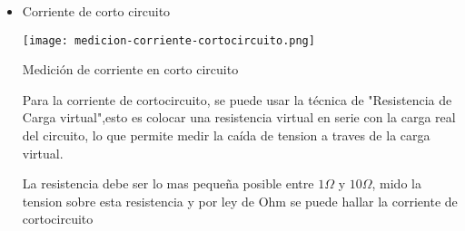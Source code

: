 \begin{itemize}
    \item Corriente de corto circuito
    \begin{ilustracion}[ht]
        \centering
        \texttt{[image: medicion-corriente-cortocircuito.png]}
        \caption{Medición de corriente en corto circuito}
        \label{ilus:medicion-corriente-cortocircuito}
    \end{ilustracion}
    Para la corriente de cortocircuito, se puede usar la técnica de "Resistencia de Carga virtual",esto es colocar una resistencia virtual en serie con la carga real del circuito, lo que permite medir la caída de tension a traves de la carga virtual.

    La resistencia debe ser lo mas pequeña posible entre $1\Omega$ y $10\Omega$, mido la tension sobre esta resistencia y por ley de Ohm se puede hallar la corriente de cortocircuito


\end{itemize}